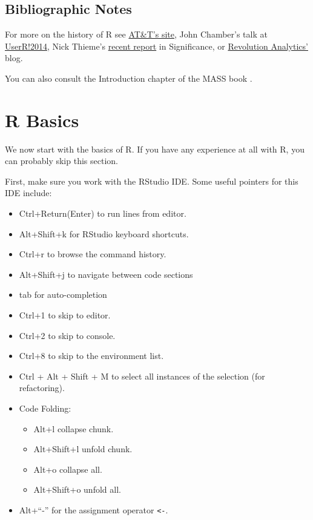 \documentclass[]{book}
\providecommand{\tightlist}{%
  \setlength{\itemsep}{0pt}\setlength{\parskip}{0pt}}
\theoremstyle{definition}
\theoremstyle{definition}
\theoremstyle{definition}
\theoremstyle{remark}
\begin{document}
\section{Bibliographic Notes}\label{bibliographic-notes}

For more on the history of R see
\href{http://www.research.att.com/articles/featured_stories/2013_09/201309_SandR.html?fbid=Yxy4qyQzmMa}{AT\&T's
site}, John Chamber's talk at
\href{https://www.youtube.com/watch?v=_hcpuRB5nGs}{UserR!2014}, Nick
Thieme's
\href{https://rss.onlinelibrary.wiley.com/doi/10.1111/j.1740-9713.2018.01169.x}{recent
report} in Significance, or
\href{https://blog.revolutionanalytics.com/2017/10/updated-history-of-r.html}{Revolution
Analytics'} blog.

You can also consult the Introduction chapter of the MASS book
\citep{venables2013modern}.

\chapter{R Basics}\label{basics}

We now start with the basics of R. If you have any experience at all
with R, you can probably skip this section.

First, make sure you work with the RStudio IDE. Some useful pointers for
this IDE include:

\begin{itemize}
\tightlist
\item
  Ctrl+Return(Enter) to run lines from editor.
\item
  Alt+Shift+k for RStudio keyboard shortcuts.
\item
  Ctrl+r to browse the command history.
\item
  Alt+Shift+j to navigate between code sections
\item
  tab for auto-completion
\item
  Ctrl+1 to skip to editor.
\item
  Ctrl+2 to skip to console.
\item
  Ctrl+8 to skip to the environment list.
\item
  Ctrl + Alt + Shift + M to select all instances of the selection (for
  refactoring).
\item
  Code Folding:

  \begin{itemize}
  \tightlist
  \item
    Alt+l collapse chunk.
  \item
    Alt+Shift+l unfold chunk.
  \item
    Alt+o collapse all.
  \item
    Alt+Shift+o unfold all.
  \end{itemize}
\item
  Alt+``-'' for the assignment operator \texttt{\textless{}-}.
\end{itemize}
\end{document}
